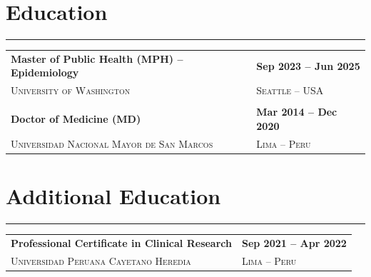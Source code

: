 \section{Education}
\vspace{-1.5em}
\textcolor{darkgray}{\rule{\textwidth}{0.5pt}}
\begin{longtable}{p{13.4cm}>{\raggedleft\arraybackslash}p{4cm}}
\textbf{Master of Public Health (MPH) -- Epidemiology} & \textbf{Sep 2023 -- Jun 2025} \\
\textsc{University of Washington} & \textsc{Seattle -- USA} \\
& \\
\textbf{Doctor of Medicine (MD)} & \textbf{Mar 2014 -- Dec 2020} \\
\textsc{Universidad Nacional Mayor de San Marcos} & \textsc{Lima -- Peru} \\
\end{longtable}

\section{Additional Education}
\vspace{-1.5em}
\textcolor{darkgray}{\rule{\textwidth}{0.5pt}}
\begin{longtable}{p{13.4cm}>{\raggedleft\arraybackslash}p{4cm}}
\textbf{Professional Certificate in Clinical Research} & \textbf{Sep 2021 -- Apr 2022} \\
\textsc{Universidad Peruana Cayetano Heredia} & \textsc{Lima -- Peru} \\
\end{longtable}
